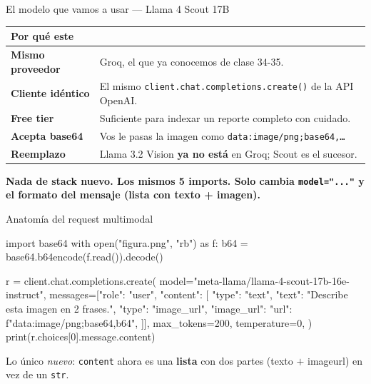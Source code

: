 \documentclass[aspectratio=169, 11pt]{beamer}
\begin{document}
\begin{frame}[shrink]{El modelo que vamos a usar --- Llama 4 Scout 17B}
  \vspace{6pt}
  \begin{center}
  \begin{tabular}{p{3.2cm} p{8.6cm}}
    \toprule
    \scriptsize\textbf{Por qué este} & \scriptsize\textbf{}\\
    \midrule
    \scriptsize\textbf{Mismo proveedor} & \scriptsize Groq, el que ya conocemos de clase 34-35.\\
    \scriptsize\textbf{Cliente idéntico} & \scriptsize El mismo \texttt{client.chat.completions.create()} de la API OpenAI.\\
    \scriptsize\textbf{Free tier} & \scriptsize Suficiente para indexar un reporte completo con cuidado.\\
    \scriptsize\textbf{Acepta base64} & \scriptsize Vos le pasas la imagen como \texttt{data:image/png;base64,\ldots}\\
    \scriptsize\textbf{Reemplazo} & \scriptsize Llama 3.2 Vision \textbf{ya no está} en Groq; Scout es el sucesor.\\
    \bottomrule
  \end{tabular}
  \end{center}
  \vspace{12pt}
  \begin{tcolorbox}[colback=arcaRed!8, colframe=arcaRed, leftrule=3pt,
    boxrule=0pt, sharp corners, left=8pt, right=8pt, top=4pt, bottom=4pt]
    {\footnotesize\color{arcaDark}\bfseries
    Nada de stack nuevo. Los mismos 5 imports. Solo cambia \texttt{model="..."}
    y el formato del mensaje (lista con texto + imagen).}
  \end{tcolorbox}
\end{frame}

\begin{frame}{Anatomía del request multimodal}
  \begin{pyblock}
import base64
with open("figura.png", "rb") as f:
    b64 = base64.b64encode(f.read()).decode()

r = client.chat.completions.create(
    model="meta-llama/llama-4-scout-17b-16e-instruct",
    messages=[{"role": "user", "content": [
        {"type": "text",      "text": "Describe esta imagen en 2 frases."},
        {"type": "image_url", "image_url": {"url": f"data:image/png;base64,{b64}"}},
    ]}],
    max_tokens=200, temperature=0,
)
print(r.choices[0].message.content)
  \end{pyblock}
  \vspace{4pt}
  \begin{tcolorbox}[colback=arcaGray, colframe=arcaRed, leftrule=3pt,
    boxrule=0pt, sharp corners, left=8pt, right=8pt, top=3pt, bottom=3pt]
    {\footnotesize\color{arcaDark}
    Lo único \emph{nuevo}: \texttt{content} ahora es una \textbf{lista} con
    dos partes (texto $+$ image\textunderscore url) en vez de un \texttt{str}.}
  \end{tcolorbox}
\end{frame}
\end{document}
